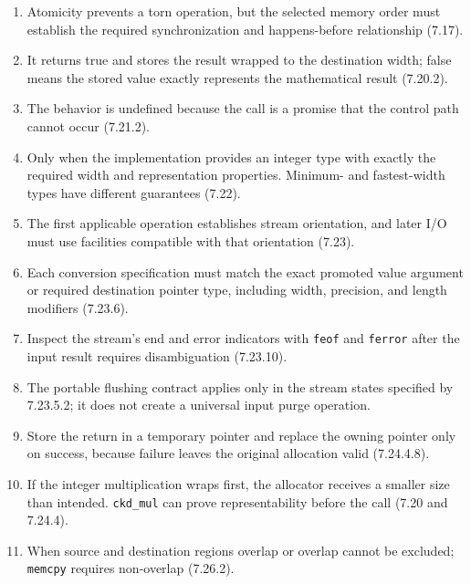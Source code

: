 \documentclass[10pt,letterpaper]{article}
\begin{document}
\begin{enumerate}
  \item Atomicity prevents a torn operation, but the selected memory order must establish the required synchronization and happens-before relationship (7.17).

  \item It returns true and stores the result wrapped to the destination width; false means the stored value exactly represents the mathematical result (7.20.2).

  \item The behavior is undefined because the call is a promise that the control path cannot occur (7.21.2).

  \item Only when the implementation provides an integer type with exactly the required width and representation properties. Minimum- and fastest-width types have different guarantees (7.22).

  \item The first applicable operation establishes stream orientation, and later I/O must use facilities compatible with that orientation (7.23).

  \item Each conversion specification must match the exact promoted value argument or required destination pointer type, including width, precision, and length modifiers (7.23.6).

  \item Inspect the stream's end and error indicators with \texttt{feof} and \texttt{ferror} after the input result requires disambiguation (7.23.10).

  \item The portable flushing contract applies only in the stream states specified by 7.23.5.2; it does not create a universal input purge operation.

  \item Store the return in a temporary pointer and replace the owning pointer only on success, because failure leaves the original allocation valid (7.24.4.8).

  \item If the integer multiplication wraps first, the allocator receives a smaller size than intended. \texttt{ckd\_mul} can prove representability before the call (7.20 and 7.24.4).

  \item When source and destination regions overlap or overlap cannot be excluded; \texttt{memcpy} requires non-overlap (7.26.2).


\end{enumerate}
\end{document}
